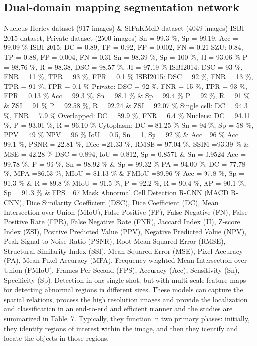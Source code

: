 \documentclass[final,5p,times,twocolumn,authoryear]{elsarticle}
\begin{document}
\subsection{Dual-domain mapping segmentation network}
Nucleus
Herlev dataset (917 images) \& SIPaKMeD dataset (4049 images) ISBI 2015 dataset, Private dataset (2500 images)
Sn = 99.3 \%, Sp = 99.19, Acc = 99.09 \% ISBI 2015: DC = 0.89, TP = 0.92, FP = 0.002, FN = 0.26 SZU: 0.84, TP = 0.88, FP = 0.004, FN = 0.31 Sn = 98.39 \%, Sp = 100 \%, JI = 93.06 \% P = 98.76 \%, R = 98.38, DSC = 98.57 \%, JI = 97.19 \% ISBI2014: DSC = 93 \%, FNR = 11 \%, TPR = 93 \%, FPR = 0.1 \% ISBI2015: DSC = 92 \%, FNR = 13 \%, TPR = 91 \%, FPR = 0.1 \% Private: DSC = 92 \%, FNR = 15 \%, TPR = 93 \%, FPR = 0.13 \% Acc = 99.3 \%, Sn = 98.1 \% \& Sp = 99.4 \% P = 92 \%, R = 91 \% \& ZSI = 91 \% P = 92.58 \%, R = 92.24 \& ZSI = 92.07 \% Single cell: DC = 94.3 \%, FNR = 7.9 \% Overlapped: DC = 89.9 \%, FNR = 6.4 \% Nucleus: DC = 94.11 \%, P = 93.01 \%, R = 96.10 \% Cytoplasm: DC = 81.25 \% Sn = 94 \%, Sp = 58 \%, PPV = 49 \% NPV = 96 \% IoU = 0.5, Sn = 1, Sp = 92 \% \& Acc =96 \%
Acc = 99.1 \%, PSNR = 22.81 \%, Dice =21.33 \%, RMSE = 97.04 \%, SSIM =93.39 \% \& MSE = 42.28 \% DSC = 0.894, IoU = 0.812, Sp = 0.8571 \& Sn = 0.9524 Acc = 99.78 \%, P = 96 \%, Sn = 98.92 \% \& Sp = 99.32 \%
PA = 94.00 \%, DC = 77.78 \%, MPA =86.53 \%, MIoU = 81.13 \% \& FMIoU =89.96 \% Acc = 97.8 \%, Sp = 91.3 \% \& R = 89.8 \%
MIoU = 91.5 \%, P = 92.2 \%, R = 90.4 \%, AP = 90.1 \%, Sp = 91.3 \% \& FPS =67
Mask Abnormal Cell Detection R-CNN (MACD R-CNN), Dice Similarity Coefficient (DSC), Dice Coefficient (DC), Mean Intersection over Union (MIoU), False Positive (FP), False Negative (FN), False Positive Rate (FPR), False Negative Rate (FNR), Jaccard Index (JI), Z-score Index (ZSI), Positive Predicted Value (PPV), Negative Predicted Value (NPV), Peak Signal-to-Noise Ratio (PSNR), Root Mean Squared Error (RMSE), Structural Similarity Index (SSI), Mean Squared Error (MSE), Pixel Accuracy (PA), Mean Pixel Accuracy (MPA), Frequency-weighted Mean Intersection over Union (FMIoU), Frames Per Second (FPS), Accuracy (Acc), Sensitivity (Sn), Specificity (Sp).
Detection in one single shot, but with multi‑scale feature maps for detecting abnormal regions in different sizes. These models can capture the spatial relations, process the high resolution images and provide the localization and classification in an end‑to‑end and efficient manner and the studies are summarized in Table 7. Typically, they function in two primary phases: initially, they identify regions of interest within the image, and then they identify and locate the objects in those regions.
\end{document}
